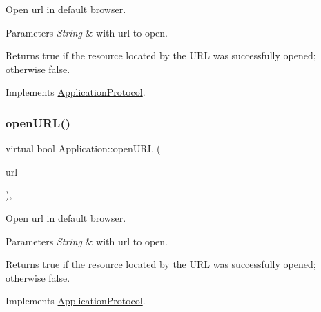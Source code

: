 Open url in default browser. 


\begin{DoxyParams}{Parameters}
{\em String} & with url to open. \\
\hline
\end{DoxyParams}
\begin{DoxyReturn}{Returns}
true if the resource located by the U\+RL was successfully opened; otherwise false. 
\end{DoxyReturn}


Implements \hyperlink{classApplicationProtocol_a152a977b301a90253ec5a6533b2e8e04}{Application\+Protocol}.

\mbox{\label{classApplication_a13ccf5ab932de8a22255b56d085bed59}} 
\subsubsection{\texorpdfstring{open\+U\+R\+L()}{openURL()}\hspace{0.1cm}{\footnotesize\ttfamily [3/12]}}
{\footnotesize\ttfamily virtual bool Application\+::open\+U\+RL (\begin{DoxyParamCaption}\item[{const std\+::string \&}]{url }\end{DoxyParamCaption})\hspace{0.3cm}{\ttfamily [override]}, {\ttfamily [virtual]}}



Open url in default browser. 


\begin{DoxyParams}{Parameters}
{\em String} & with url to open. \\
\hline
\end{DoxyParams}
\begin{DoxyReturn}{Returns}
true if the resource located by the U\+RL was successfully opened; otherwise false. 
\end{DoxyReturn}


Implements \hyperlink{classApplicationProtocol_a152a977b301a90253ec5a6533b2e8e04}{Application\+Protocol}.

\mbox{\label{classApplication_ab77675704c2cec7b0ed8413f4d556562}} 
